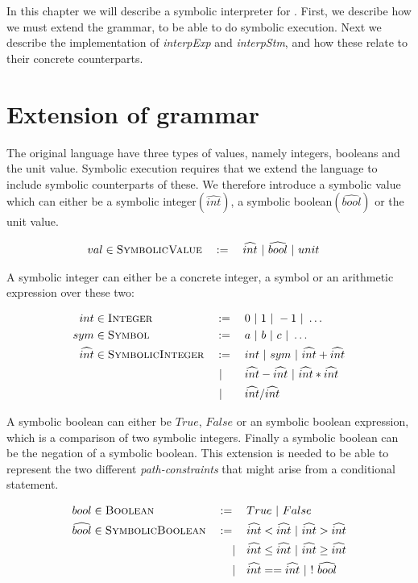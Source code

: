 In this chapter we will describe a symbolic interpreter for \explanguage. First, we describe how we must extend the grammar, to be able to do symbolic execution. Next we describe the implementation of \textsl{interpExp} and \textsl{interpStm}, and how these relate to their concrete counterparts. 
\section{Extension of grammar}

The original language have three types of values, namely integers, booleans and the unit value. Symbolic execution requires that we extend the language to include symbolic counterparts of these. We therefore introduce a symbolic value which can either be a symbolic integer$(\widehat{int})$, a symbolic boolean$(\widehat{bool})$ or the unit value.

\begin{alignat*}{3}
	val & \in \textsc{SymbolicValue} && := \quad  \widehat{int} \ | \ 
	\widehat{bool} \ | \  unit
\end{alignat*}



 A symbolic integer can either be a concrete integer, a symbol or an arithmetic expression over these two:



\begin{alignat*}{3}
	int & \in \textsc{Integer} && := \quad 0 \ | \  1 \ | \  -1 \ | \  \ldots\\
	sym & \in \textsc{Symbol} && := \quad a \ | \  b \ | \  c \ | \  \ldots \\	
	\widehat{int} & \in \textsc{SymbolicInteger} && := \quad int \ | \  sym \ | \  \widehat{int} + \widehat{int} \\
	& &&  \ | \  \ \ \quad \widehat{int} - \widehat{int} \ | \  \widehat{int} * \widehat{int}\\
	& && \ | \  \ \ \quad  \widehat{int} / \widehat{int}\\
\end{alignat*}

A symbolic boolean can either be $True$, $False$ or an symbolic boolean expression, which is a comparison of two symbolic integers. Finally a symbolic boolean can be the negation of a symbolic boolean. This extension is needed to be able to represent the two different \emph{path-constraints} that might arise from a conditional statement.

\begin{alignat*}{3}
	bool & \in \textsc{Boolean} && := \quad True \ | \  False\\
	\widehat{bool} & \in \textsc{SymbolicBoolean} && := \quad \widehat{int} < \widehat{int} \ | \  \widehat{int} > \widehat{int}\\
	& && \quad \ | \  \ \ \widehat{int} \leq \widehat{int} \ | \   \widehat{int} \geq \widehat{int}\\
	& && \quad \ | \  \ \ \widehat{int} == \widehat{int} \ | \   ! \ \widehat{bool}
\end{alignat*}



